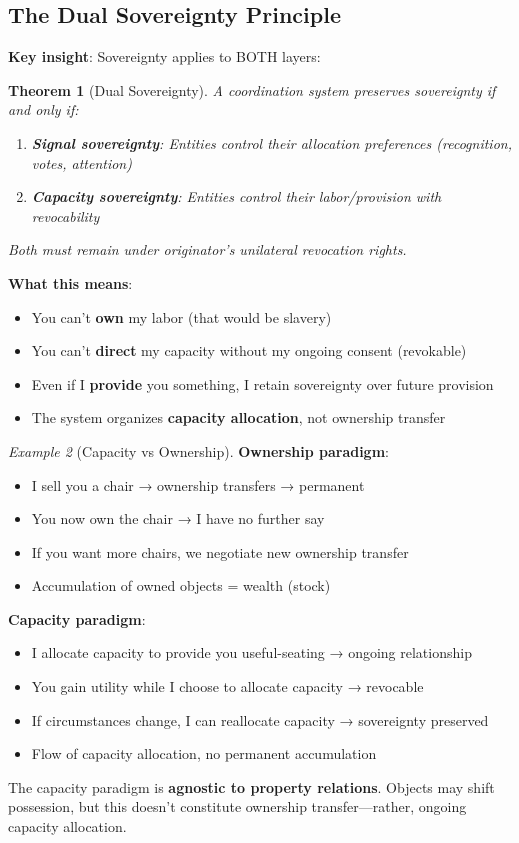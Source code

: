 \documentclass[11pt,a4paper]{article}
\newtheorem{theorem}{Theorem}[section]
\theoremstyle{definition}
\theoremstyle{remark}
\newtheorem{example}[theorem]{Example}
\begin{document}
\subsection{The Dual Sovereignty Principle}

\textbf{Key insight}: Sovereignty applies to BOTH layers:

\begin{theorem}[Dual Sovereignty]
A coordination system preserves sovereignty if and only if:
\begin{enumerate}
\item \textbf{Signal sovereignty}: Entities control their allocation preferences (recognition, votes, attention)
\item \textbf{Capacity sovereignty}: Entities control their labor/provision with revocability
\end{enumerate}

Both must remain under originator's unilateral revocation rights.
\end{theorem}

\textbf{What this means}:
\begin{itemize}
\item You can't \textbf{own} my labor (that would be slavery)
\item You can't \textbf{direct} my capacity without my ongoing consent (revokable)
\item Even if I \textbf{provide} you something, I retain sovereignty over future provision
\item The system organizes \textbf{capacity allocation}, not ownership transfer
\end{itemize}

\begin{example}[Capacity vs Ownership]
\textbf{Ownership paradigm}:
\begin{itemize}
\item I sell you a chair → ownership transfers → permanent
\item You now own the chair → I have no further say
\item If you want more chairs, we negotiate new ownership transfer
\item Accumulation of owned objects = wealth (stock)
\end{itemize}

\textbf{Capacity paradigm}:
\begin{itemize}
\item I allocate capacity to provide you useful-seating → ongoing relationship
\item You gain utility while I choose to allocate capacity → revocable
\item If circumstances change, I can reallocate capacity → sovereignty preserved
\item Flow of capacity allocation, no permanent accumulation
\end{itemize}

The capacity paradigm is \textbf{agnostic to property relations}. Objects may shift possession, but this doesn't constitute ownership transfer—rather, ongoing capacity allocation.
\end{example}
\end{document}
